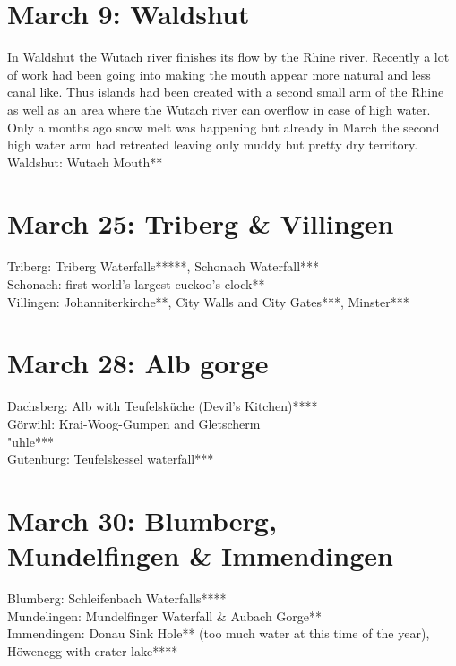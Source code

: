 \section{March 9: Waldshut}
\label{2021:Waldshut0309}

In Waldshut the Wutach river finishes its flow by the Rhine river. Recently a lot of work had been going into making the mouth appear more natural and less canal like. Thus islands had been created with a second small arm of the Rhine as well as an area where the Wutach river can overflow in case of high water. Only a months ago snow melt was happening but already in March the second high water arm had retreated leaving only muddy but pretty dry territory.\\

Waldshut: Wutach Mouth**\\

\section{March 25: Triberg \& Villingen}
\label{2021:Triberg}

Triberg: Triberg Waterfalls*****, Schonach Waterfall***\\
Schonach: first world's largest cuckoo's clock**\\
Villingen: Johanniterkirche**, City Walls and City Gates***, Minster***

\section{March 28: Alb gorge}
\label{2021:Albtal}

Dachsberg: Alb with Teufelsk\"uche (Devil's Kitchen)****\\
G\"orwihl: Krai-Woog-Gumpen and Gletscherm\\"uhle***\\
Gutenburg: Teufelskessel waterfall***

\section{March 30: Blumberg, Mundelfingen \& Immendingen}
\label{2021:Blumberg}

Blumberg: Schleifenbach Waterfalls****\\
Mundelingen: Mundelfinger Waterfall \& Aubach Gorge**\\
Immendingen: Donau Sink Hole** (too much water at this time of the year), H\"owenegg with crater lake****\\

